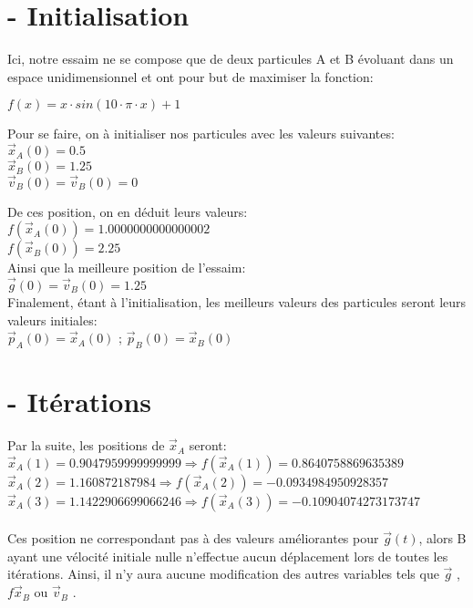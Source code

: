 \section{- Initialisation}
Ici, notre essaim ne se compose que de deux particules A et B évoluant dans un espace unidimensionnel et ont pour but de maximiser la fonction:\\
\begin{center}
    $f(x) = x \cdot sin(10 \cdot \pi \cdot x) + 1$ \\
\end{center}

Pour se faire, on à initialiser nos particules avec les valeurs suivantes:\\
$\vec{x}_A(0) = 0.5$\\
$\vec{x}_B(0) = 1.25$\\
$\vec{v}_B(0) = \vec{v}_B(0) = 0$



De ces position, on en déduit leurs valeurs:\\ $f(\vec{x}_A(0)) = 1.0000000000000002$\\
$f(\vec{x}_B(0)) = 2.25$\\


Ainsi que la meilleure position de l'essaim:\\
$\vec{g}(0) = \vec{v}_B(0) = 1.25$\\

Finalement, étant à l'initialisation, les meilleurs valeurs des particules seront leurs valeurs initiales:\\
$\vec{p}_A(0) = \vec{x}_A(0)$   ;   $\vec{p}_B(0) = \vec{x}_B(0)$


\section{- Itérations}
Par la suite, les positions de $\vec{x}_A$ seront:\\
$\vec{x}_A(1) =  0.9047959999999999 \Rightarrow f(\vec{x}_A(1)) = 0.8640758869635389 $ \\
$\vec{x}_A(2) =  1.160872187984 \Rightarrow f(\vec{x}_A(2)) = -0.0934984950928357 $ \\
$\vec{x}_A(3) =  1.1422906699066246 \Rightarrow f(\vec{x}_A(3)) = -0.10904074273173747 $ \\
\\

Ces position ne correspondant pas à des valeurs améliorantes pour $\vec{g}(t)$, alors B ayant une vélocité initiale nulle n'effectue aucun déplacement lors de toutes les itérations.
Ainsi, il n'y aura aucune modification des autres variables tels que $\vec{g}$ , $f\vec{x}_B$ ou $\vec{v}_B$ .

